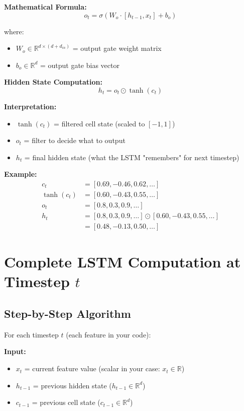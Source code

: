 \documentclass[12pt]{article}
\begin{document}
\textbf{Mathematical Formula:}
\[
o_t = \sigma(W_o \cdot [h_{t-1}, x_t] + b_o)
\]

where:
\begin{itemize}
    \item $W_o \in \mathbb{R}^{d \times (d + d_{in})}$ = output gate weight matrix
    \item $b_o \in \mathbb{R}^d$ = output gate bias vector
\end{itemize}

\textbf{Hidden State Computation:}
\[
h_t = o_t \odot \tanh(c_t)
\]

\textbf{Interpretation:}
\begin{itemize}
    \item $\tanh(c_t)$ = filtered cell state (scaled to $[-1, 1]$)
    \item $o_t$ = filter to decide what to output
    \item $h_t$ = final hidden state (what the LSTM "remembers" for next timestep)
\end{itemize}

\textbf{Example:}
\[
\begin{aligned}
c_t &= [0.69, -0.46, 0.62, \ldots] \\
\tanh(c_t) &= [0.60, -0.43, 0.55, \ldots] \\
o_t &= [0.8, 0.3, 0.9, \ldots] \\
h_t &= [0.8, 0.3, 0.9, \ldots] \odot [0.60, -0.43, 0.55, \ldots] \\
&= [0.48, -0.13, 0.50, \ldots]
\end{aligned}
\]

\section{Complete LSTM Computation at Timestep $t$}

\subsection{Step-by-Step Algorithm}

For each timestep $t$ (each feature in your code):

\textbf{Input:}
\begin{itemize}
    \item $x_t$ = current feature value (scalar in your case: $x_t \in \mathbb{R}$)
    \item $h_{t-1}$ = previous hidden state ($h_{t-1} \in \mathbb{R}^d$)
    \item $c_{t-1}$ = previous cell state ($c_{t-1} \in \mathbb{R}^d$)
\end{itemize}
\end{document}
